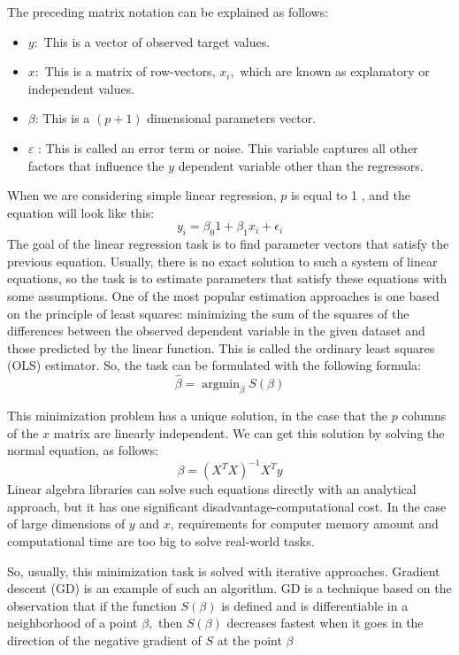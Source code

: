 \documentclass[12pt]{article}
\begin{document}
The preceding matrix notation can be explained as follows:
\begin{itemize}
    \item $y:$ This is a vector of observed target values.
    \item $x:$ This is a matrix of row-vectors, $x_{i},$ which are known as explanatory or independent values.
    \item $\beta$: This is a $(p+1)$ dimensional parameters vector.
    \item $\varepsilon$ : This is called an error term or noise. This variable captures all other factors that influence the $y$ dependent variable other than the regressors.
\end{itemize}

When we are considering simple linear regression, $p$ is equal to 1 , and the equation will look like this:
$$
y_{i}=\beta_{0} 1+\beta_{1} x_{i}+\epsilon_{i}
$$
The goal of the linear regression task is to find parameter vectors that satisfy the previous equation. Usually, there is no exact solution to such a system of linear equations, so the task is to estimate parameters that satisfy these equations with some assumptions. One of the most popular estimation approaches is one based on the principle of least squares:
minimizing the sum of the squares of the differences between the observed dependent variable in the given dataset and those predicted by the linear function. This is called the ordinary least squares (OLS) estimator. So, the task can be formulated with the following formula:
$$
\hat{\beta}=\operatorname{argmin}_{\beta} S(\beta)
$$

This minimization problem has a unique solution, in the case that the $p$ columns of the $x$ matrix are linearly independent. We can get this solution by solving the normal equation, as follows:
$$
\beta=\left(X^{T} X\right)^{-1} X^{T} y
$$
Linear algebra libraries can solve such equations directly with an analytical approach, but it has one significant disadvantage-computational cost. In the case of large dimensions of $y$ and $x$, requirements for computer memory amount and computational time are too big to solve real-world tasks.

So, usually, this minimization task is solved with iterative approaches. Gradient descent (GD) is an example of such an algorithm. GD is a technique based on the observation that if the function $S(\beta)$ is defined and is differentiable in a neighborhood of a point $\beta,$ then $S(\beta)$ decreases fastest when it goes in the direction of the negative gradient of $S$ at the point $\beta$
\end{document}
